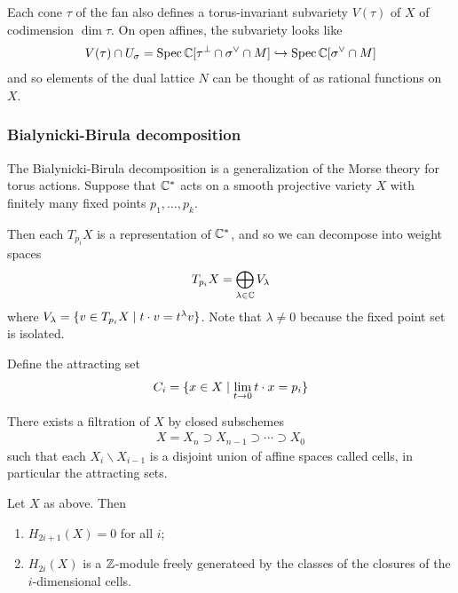 Each cone $\tau$ of the fan also defines a torus-invariant subvariety $V(\tau)$ of $X$ of codimension $\dim \tau$.
On open affines, the subvariety looks like \begin{align*}
	V(\tau) \cap U_\sigma = \operatorname{Spec} \mathbb{C}[\tau^{\perp} \cap \sigma^\vee \cap M] \hookrightarrow \operatorname{Spec} \mathbb{C}[\sigma^\vee \cap M]
\end{align*} and so elements of the dual lattice $N$ can be thought of as rational functions on $X$.
\subsubsection{Bialynicki-Birula decomposition}
The Bialynicki-Birula decomposition is a
generalization of the Morse theory for torus actions. Suppose
that $\mathbb{C}^*$ acts on a smooth projective variety $X$ with finitely
many fixed points $p_1,\ldots,p_k$.

Then each $T_{p_i}X$ is a representation of $\mathbb{C}^*$, and so we can decompose
into weight spaces \begin{align*}
	T_{p_i}X = \bigoplus_{\lambda\in \mathbb{C}} V_\lambda
\end{align*} where $V_\lambda = \{v\in T_{p_i}X \mid t\cdot v = t^\lambda v\}$.
Note that $\lambda\neq 0 $ because the fixed point set is isolated.

Define the attracting set \begin{align*}
	C_i = \{x\in X \mid \lim_{t\to 0} t\cdot x = p_i\}
\end{align*}

\begin{theorem}
	There exists a filtration of $X$ by closed subschemes \begin{align*}
		X = X_n \supset X_{n-1} \supset \cdots \supset X_0
	\end{align*} such that
	each $X_i \backslash X_{i-1}$ is a disjoint union of affine spaces called cells,
	in particular the attracting sets.
\end{theorem}

\begin{cor}
	Let $X$ as above. Then \begin{enumerate}
		\item $H_{2i+1}(X) = 0$ for all $i$;
		\item $H_{2i}(X)$ is a $\mathbb{Z}$-module freely generateed by the classes
		      of the closures of the $i$-dimensional cells.
	\end{enumerate}
\end{cor}

